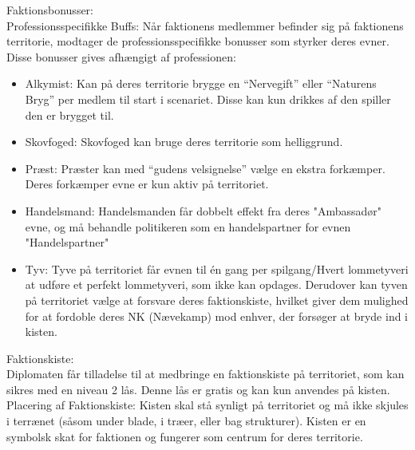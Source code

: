 Faktionsbonusser:\\
Professionsspecifikke Buffs: Når faktionens medlemmer befinder sig på faktionens territorie, modtager de professionsspecifikke bonusser som styrker deres evner. Disse bonusser gives afhængigt af professionen:
\begin{itemize}
    \item Alkymist: Kan på deres territorie brygge en “Nervegift” eller “Naturens Bryg” per medlem til start i scenariet. Disse kan kun drikkes af den spiller den er brygget til.
    \item Skovfoged: Skovfoged kan bruge deres territorie som helliggrund.
    \item Præst: Præster kan med “gudens velsignelse” vælge en ekstra forkæmper. Deres forkæmper evne er kun aktiv på territoriet.
    \item Handelsmand: Handelsmanden får dobbelt effekt fra deres "Ambassadør" evne, og må behandle politikeren som en handelspartner for evnen "Handelspartner"
    \item Tyv: Tyve på territoriet får evnen til én gang per spilgang/Hvert lommetyveri at udføre et perfekt lommetyveri, som ikke kan opdages. Derudover kan tyven på territoriet vælge at forsvare deres faktionskiste, hvilket giver dem mulighed for at fordoble deres NK (Nævekamp) mod enhver, der forsøger at bryde ind i kisten.
\end{itemize}
Faktionskiste:\\
Diplomaten får tilladelse til at medbringe en faktionskiste på territoriet, som kan sikres med en niveau 2 lås. Denne lås er gratis og kan kun anvendes på kisten.\\
Placering af Faktionskiste: Kisten skal stå synligt på territoriet og må ikke skjules i terrænet (såsom under blade, i træer, eller bag strukturer). Kisten er en symbolsk skat for faktionen og fungerer som centrum for deres territorie.










